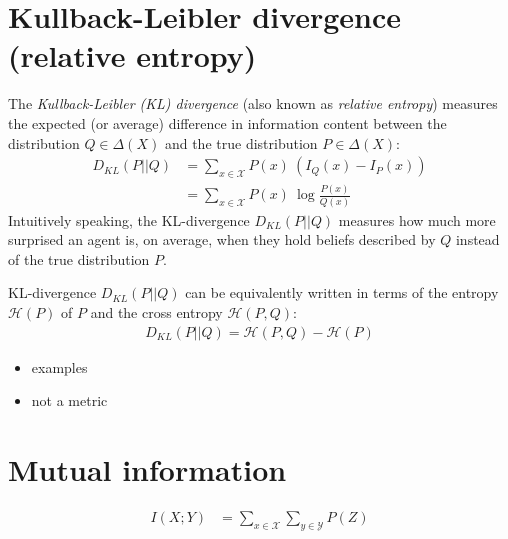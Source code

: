 \documentclass[nobib,nofonts]{tufte-handout}
\begin{document}
\section{Kullback-Leibler divergence (relative entropy)}

The \emph{Kullback-Leibler (KL) divergence} (also known as \emph{relative entropy}) measures the expected (or average) difference in information content between the distribution $Q \in \Delta(X)$ and the true distribution $P \in \Delta(X)$:
\begin{align*}
  D_{KL}(P || Q) & = \sum_{x \in \mathcal{X}} P(x) \ \left ( I_{Q}(x) - I_{P}(x) \right ) \\
  & = \sum_{x \in \mathcal{X}} P(x) \ \log  \frac{P(x)}{Q(x)}
\end{align*}
Intuitively speaking, the KL-divergence $D_{KL}(P || Q)$ measures how much more surprised an agent is, on average, when they hold beliefs described by $Q$ instead of the true distribution $P$.

KL-divergence $D_{KL}(P || Q)$ can be equivalently written in terms of the entropy $\mathcal{H}(P)$ of $P$ and the cross entropy $\mathcal{H}(P,Q)$:
\begin{align*}
  D_{KL}(P || Q) = \mathcal{H}(P,Q) - \mathcal{H}(P)
\end{align*}

\begin{itemize}
  \item examples
  \item not a metric
\end{itemize}


\section{Mutual information}

\begin{align*}
  I(X;Y) & = \sum_{x \in \mathcal{X}} \sum_{y \in \mathcal{Y}} P(Z)
\end{align*}
\end{document}
